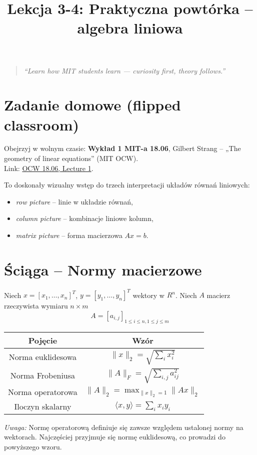\documentclass[12pt]{article}
\title{Lekcja 3-4: Praktyczna powtórka – algebra liniowa}
\author{}
\date{}
\begin{document}
\maketitle

\begin{quote}
\emph{“Learn how MIT students learn — curiosity first, theory follows.”}
\end{quote}

\section*{Zadanie domowe (flipped classroom)}
Obejrzyj w wolnym czasie: \textbf{Wykład 1 MIT-a 18.06}, Gilbert Strang – „The geometry of linear equations” (MIT OCW).\\[0.5em]
Link: \href{https://ocw.mit.edu/courses/18-06-linear-algebra-spring-2010/resources/lecture-1-the-geometry-of-linear-equations/}{OCW 18.06, Lecture 1}.  

To doskonały wizualny wstęp do trzech interpretacji układów równań liniowych:
\begin{itemize}
  \item \emph{row picture} – linie w układzie równań,
  \item \emph{column picture} – kombinacje liniowe kolumn,
  \item \emph{matrix picture} – forma macierzowa \(Ax=b\).
\end{itemize}

\vspace{1em}


\vspace{1em}
\section*{Ściąga – Normy macierzowe}

 Niech $x=[x_1,\ldots,x_n]^T$, $y=[y_1,\ldots,y_n]^T$ wektory w $R^n$.
 Niech $A$ macierz rzeczywista wymiaru $n\times m$
 \[
 A=[a_{i,j}]_{1\leq i\leq n,1\leq j\leq m}
 \]
\begin{center}
\begin{tabular}{|c|c|}
\hline
Pojęcie & Wzór \\
\hline
Norma euklidesowa & $\|x\|_2 = \sqrt{\sum_i x_i^2}$ \\
Norma Frobeniusa & $\|A\|_F = \sqrt{\sum_{i,j} a_{ij}^2}$ \\
Norma operatorowa & $\|A\|_2 = \max_{\|x\|_2=1} \|Ax\|_2$ \\
Iloczyn skalarny & $\langle x, y \rangle = \sum_i x_i y_i$\\
\hline
\end{tabular}
\end{center}
\smallskip
\noindent
\emph{Uwaga:} Normę operatorową definiuje się zawsze względem ustalonej normy na wektorach.
Najczęściej przyjmuje się normę euklidesową, co prowadzi do powyższego wzoru.
\end{document}
